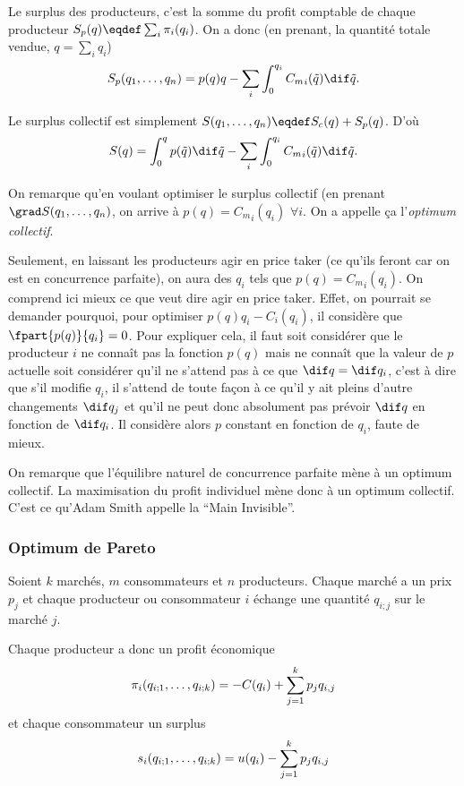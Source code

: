 Le surplus des producteurs, c'est la somme du profit comptable de chaque
producteur
$\surplusprod(q) \eqdef \sum_i \pcompt_i(q_i)$.
On a donc (en prenant, la quantité totale vendue, $q = \sum_i q_i$)
\[ \surplusprod(q_1, \ldots, q_n) = p(q)q -
\sum_i \int_0^{q_i} {C_m}_i(\tilde{q}) \dif \tilde{q}. \]

Le surplus collectif est simplement
$\surpluscoll(q_1, \ldots, q_n)
\eqdef \surpluscons(q) + \surplusprod(q)$.
D'où
\[ \surpluscoll(q) = \int_0^{q}p(\tilde{q}) \dif \tilde{q}
- \sum_i \int_0^{q_i} {C_m}_i(\tilde{q}) \dif \tilde{q}. \]

On remarque qu'en voulant optimiser le surplus collectif
(en prenant $\grad \surpluscoll(q_1, \ldots, q_n)$,
on arrive à $p(q) = {C_m}_i(q_i)$ $\forall i$.
On a appelle ça l'\emph{optimum collectif}.

Seulement, en laissant les producteurs agir en price taker
(ce qu'ils feront car on est en concurrence parfaite),
on aura des $q_i$ tels que $p(q) = {C_m}_i(q_i)$.
On comprend ici mieux ce que veut dire agir en price taker.
Effet, on pourrait se demander pourquoi, pour optimiser
$p(q)q_i - {C}_i(q_i)$, il considère que $\fpart{p(q)}{q_i} = 0$.
Pour expliquer cela,
il faut soit considérer que le producteur $i$ ne connaît pas la fonction $p(q)$
mais ne connaît que la valeur de $p$ actuelle soit considérer qu'il
ne s'attend pas à ce que $\dif q = \dif q_i$, c'est à dire que s'il modifie
$q_i$, il s'attend de toute façon à ce qu'il y ait pleins d'autre changements
$\dif q_j$ et qu'il ne peut donc absolument pas prévoir $\dif q$ en fonction
de $\dif q_i$. Il considère alors $p$ constant en fonction de $q_i$,
faute de mieux.

On remarque que l'équilibre naturel de concurrence parfaite mène à
un optimum collectif.
La maximisation du profit individuel mène donc à un optimum collectif.
C'est ce qu'Adam Smith appelle la ``Main Invisible''.

\subsubsection{Optimum de Pareto}
Soient $k$ marchés, $m$ consommateurs et $n$ producteurs.
Chaque marché a un prix $p_j$ et chaque producteur ou consommateur $i$
échange une quantité $q_{i;j}$ sur le marché $j$.

Chaque producteur a donc un profit économique
\[ \pi_i(q_{i;1},\ldots,q_{i;k}) = -C(q_i) + \sum_{j=1}^k p_jq_{i,j} \]
et chaque consommateur un surplus
\[ s_i(q_{i;1},\ldots,q_{i;k}) = u(q_i) - \sum_{j=1}^k p_jq_{i,j} \]

